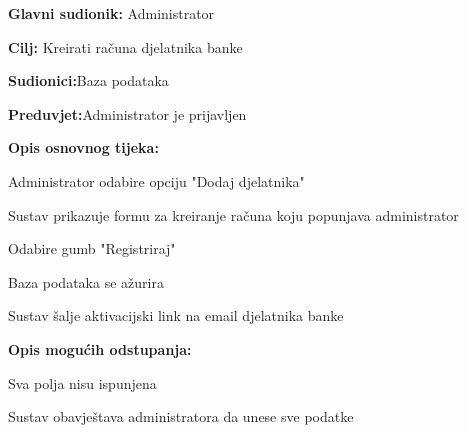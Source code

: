 \noindent {}

\begin{packed_item}
	
	\item \textbf{Glavni sudionik: }{Administrator}
	\item  \textbf{Cilj:} {Kreirati računa djelatnika banke}
	\item  \textbf{Sudionici:}{Baza podataka}
	\item  \textbf{Preduvjet:}{Administrator je prijavljen}
	\item  \textbf{Opis osnovnog tijeka:}
	
	\item[] \begin{packed_enum}
		
		\item {Administrator odabire opciju "Dodaj djelatnika"}
		\item {Sustav prikazuje formu za kreiranje računa koju popunjava administrator} 
		\item {Odabire gumb "Registriraj"}
		\item {Baza podataka se ažurira}
		\item {Sustav šalje aktivacijski link na email djelatnika banke}
	\end{packed_enum}
	
	\item  \textbf{Opis mogućih odstupanja:}
	
	\item[] \begin{packed_item}
		
		\item[2.a]{Sva polja nisu ispunjena}
		\item[] \begin{packed_enum}
			
			\item Sustav obavještava administratora da unese sve podatke
			
		\end{packed_enum}
	\end{packed_item}
\end{packed_item}
\eject 

